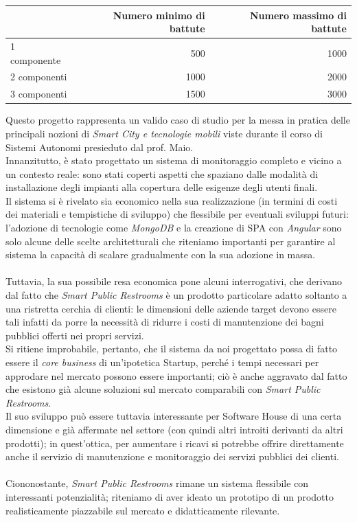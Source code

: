 \documentclass[12pt]{article}
\begin{document}
\vspace{1cm}
\begin{tabular}{l|rr}
 & Numero minimo di battute & Numero massimo di battute \\
 \hline
 1 componente & 500 & 1000 \\
 2 componenti & 1000 & 2000 \\
 3 componenti & 1500 & 3000 \\
 \hline
\end{tabular}
\newpage
Questo progetto rappresenta un valido caso di studio per la messa in pratica delle principali nozioni di \textit{Smart City e tecnologie mobili} viste durante il corso di Sistemi Autonomi presieduto dal prof. Maio.\\
Innanzitutto, è stato progettato un sistema di monitoraggio completo e vicino a un contesto reale: sono stati coperti aspetti che spaziano dalle modalità di installazione degli impianti alla copertura delle esigenze degli utenti finali.\\
Il sistema si è rivelato sia economico nella sua realizzazione (in termini di costi dei materiali e tempistiche di sviluppo) che flessibile per eventuali sviluppi futuri: l'adozione di tecnologie come \textit{MongoDB} e la creazione di SPA con \textit{Angular} sono solo alcune delle scelte architetturali che riteniamo importanti per garantire al sistema la capacità di scalare gradualmente con la sua adozione in massa.\\\\
Tuttavia, la sua possibile resa economica pone alcuni interrogativi, che derivano dal fatto che \textit{Smart Public Restrooms} è un prodotto particolare adatto soltanto a una ristretta cerchia di clienti: le dimensioni delle aziende target devono essere tali infatti da porre la necessità di ridurre i costi di manutenzione dei bagni pubblici offerti nei propri servizi.\\
Si ritiene improbabile, pertanto, che il sistema da noi progettato possa di fatto essere il \textit{core business} di un'ipotetica Startup, perché i tempi necessari per approdare nel mercato possono essere importanti; ciò è anche aggravato dal fatto che esistono già alcune soluzioni sul mercato comparabili con \textit{Smart Public Restrooms}.\\
Il suo sviluppo può essere tuttavia interessante per Software House di una certa dimensione e già affermate nel settore (con quindi altri introiti derivanti da altri prodotti); in quest'ottica, per aumentare i ricavi si potrebbe offrire direttamente anche il servizio di manutenzione e monitoraggio dei servizi pubblici dei clienti.\\\\
Ciononostante, \textit{Smart Public Restrooms} rimane un sistema flessibile con interessanti potenzialità; riteniamo di aver ideato un prototipo di un prodotto realisticamente piazzabile sul mercato e didatticamente rilevante.
\newpage
\end{document}
